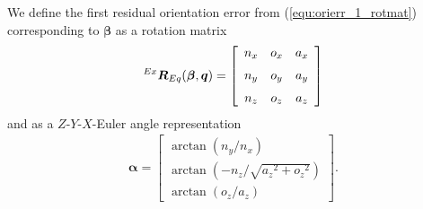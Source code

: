 \documentclass[twocolumn,10pt]{IFTOMM}
\newcommand{\bm}[1]{\boldsymbol{#1}}
\newcommand{\rotmat}[2]{{{ }^{#1}\boldsymbol{R}}_{#2}}
\begin{document}
We define the first residual orientation error from (\ref{equ:orierr_1_rotmat}) corresponding to $\bm{\beta}$ as a rotation matrix
%
\begin{align}
\rotmat{Ex}{Eq}(\bm{\beta},\bm{q})
=\left[ \begin {array}{ccc} {n_x}&{o_x}&{a_x} \\ \noalign{\medskip}{n_y}&{o_y}&{a_y}\\ \noalign{\medskip}{ n_z}&{o_z}&{a_z}\end {array} \right] 
\label{equ:orierr_1_rotmat_def}
\end{align}
%
and as a $Z$-$Y$-$X$-Euler angle representation
%
\begin{align}
\bm{\alpha} =
\begin{bmatrix}
\arctan \left( {n_y} / { n_x} \right) \\ 
\arctan \left( -{n_z} / \sqrt {{{a_z}}^{2}+{{ o_z}}^{2}} \right) \\ 
\arctan \left( {o_z} / {a_z} \right)
\end{bmatrix}.
\label{equ:alpha_xyz}
\end{align}
\end{document}
